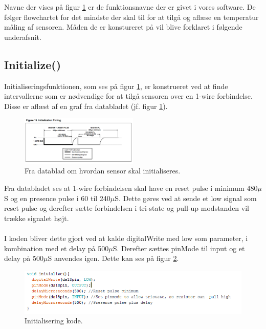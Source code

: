 Navne der vises på figur \ref{sensor_kom} er de funktionsnavne der er givet i vores software. De følger flowchartet for det mindste der skal til for at tilgå og aflæse en temperatur måling af sensoren. Måden de er konstureret på vil blive forklaret i følgende underafsnit.


\subsection{Initialize()}
Initialiseringsfunktionen, som ses på figur \ref{sensor_kom}, er konstrueret ved at finde intervallerne som er nødvendige for at tilgå sensoren over en 1-wire forbindelse. Disse er aflæst af en graf fra databladet (jf. figur \ref{sensor_kom}).




\begin{figure}[h!]
  \centering
  \includegraphics[width=0.5\textwidth]{figures/Initialization_timing.png}
  \caption{Fra datablad om hvordan sensor skal initialiseres.}
  \label{sensor_kom}
\end{figure}

Fra databladet ses at 1-wire forbindelsen skal have en reset pulse i minimum 480$\mu$S og en presence pulse i 60 til 240$\mu$S. Dette gøres ved at sende et low signal som reset pulse og derefter sætte forbindelsen i tri-state og pull-up modstanden vil trække signalet højt. 
\\
\\
I koden bliver dette gjort ved at kalde digitalWrite med low som parameter, i kombination med et delay på 500$\mu$S. Derefter sættes pinMode til input og et delay på 500$\mu$S anvendes igen. Dette kan ses på figur \ref{sensor_kode}.

\begin{figure}[h!]
  \centering
  \includegraphics[width=1\textwidth]{figures/Init.png}
  \caption{Initialisering kode.}
  \label{sensor_kode}
\end{figure}

